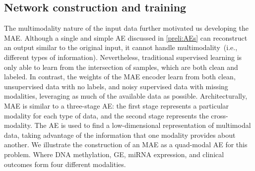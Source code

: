 
\subsection{Network construction and training}
The multimodality nature of the input data further motivated us developing the MAE. Although a single and simple AE discussed in \cref{preli:AEs} can reconstruct an output similar to the original input, it cannot handle multimodality~(i.e., different types of information). Nevertheless, traditional supervised learning is only able to learn from the intersection of samples, which are both clean and labeled. In contrast, the weights of the MAE encoder learn from both clean, unsupervised data with no labels, and noisy supervised data with missing modalities, leveraging as much of the available data as possible. Architecturally, MAE is similar to a three-stage AE: the first stage represents a particular modality for each type of data, and the second stage represents the cross-modality. The AE is used to find a low-dimensional representation of multimodal data, taking advantage of the information that one modality provides about another. We illustrate the construction of an MAE as a quad-modal AE for this problem. Where DNA methylation, GE, miRNA expression, and clinical outcomes form four different modalities. 

